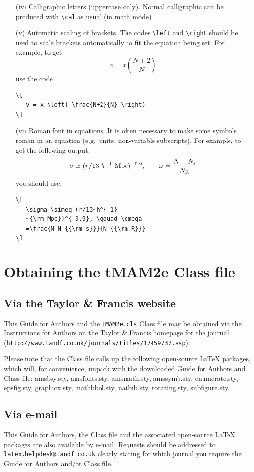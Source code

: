 \documentclass[]{tMAM2e}
\begin{document}
\begin{enumerate}
\item[(iv)] Calligraphic letters (uppercase only).
%
%
Normal calligraphic can be produced with \verb"\cal" as usual (in
math mode).

\item[(v)] Automatic scaling of brackets. The codes \verb"\left" and
\verb"\right" should  be used to scale brackets automatically to
fit the equation being set. For example, to get
\[
   v = x \left( \frac{N+2}{N} \right)
\]
use the code
%
\begin{verbatim}
\[
   v = x \left( \frac{N+2}{N} \right)
\]
\end{verbatim}

\item[(vi)] Roman font in equations. It is often necessary to make some
symbols roman in an equation (e.g.\ units, non-variable
subscripts). For example, to get the following output:
\[
   \sigma \simeq (r/13~h^{-1}~{\rm Mpc})^{-0.9},
   \qquad \omega = \frac{N-N_{\rm s}}{N_{\rm R}}
\]
\noindent you should use:
%
\begin{verbatim}
\[
   \sigma \simeq (r/13~h^{-1}
   ~{\rm Mpc})^{-0.9}, \qquad \omega
   =\frac{N-N_{{\rm s}}}{N_{{\rm R}}}
\]
\end{verbatim}
\end{enumerate}

\section{Obtaining the tMAM2e Class file}\label{FTP}

\subsection{Via the Taylor \& Francis website}

\noindent This Guide for Authors and the {\tt tMAM2e.cls} Class file may be obtained via the Instructions for Authors on the Taylor \& Francis homepage for the journal ({\tt{http://www.tandf.co.uk/journals/titles/17459737.asp}}).

Please note that the Class file calls up the following open-source LaTeX packages, which will, for convenience, unpack with the downloaded Guide for Authors and Class file: amsbsy.sty, amsfonts.sty, amsmath.sty, amssymb.sty, enumerate.sty, epsfig.sty, graphicx.sty, mathbbol.sty, natbib.sty, rotating.sty, subfigure.sty.

\subsection{Via e-mail}

This Guide for Authors, the Class file and the associated open-source LaTeX packages are also available by e-mail. Requests should be addressed to {\tt latex.helpdesk@tandf.co.uk} clearly stating for which journal you require the Guide for Authors and/or Class file.


\label{lastpage}
\end{document}
